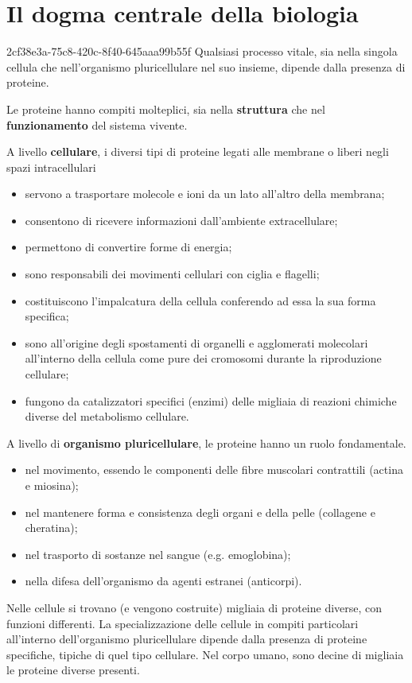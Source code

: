\documentclass[preview]{standalone}
\begin{document}
\genpage

\section{Il dogma centrale della biologia}

\begin{snippet}{2cf38e3a-75c8-420c-8f40-645aaa99b55f}
    Qualsiasi processo vitale, sia nella singola cellula che nell'organismo pluricellulare nel suo
    insieme, dipende dalla presenza di proteine.

    Le proteine hanno compiti molteplici, sia nella \textbf{struttura}
    che nel \textbf{funzionamento} del sistema
    vivente.

    A livello \textbf{cellulare}, i diversi tipi di proteine legati alle membrane o liberi negli spazi
    intracellulari

    \begin{itemize}
        \item servono a trasportare molecole e ioni da un lato all'altro della membrana;
        \item consentono di ricevere informazioni dall'ambiente extracellulare;
        \item permettono di convertire forme di energia;
        \item sono responsabili dei movimenti cellulari con ciglia e flagelli;
        \item costituiscono l'impalcatura della cellula conferendo ad essa la sua forma specifica;
        \item sono all'origine degli spostamenti di organelli e agglomerati molecolari all'interno della
        cellula come pure dei cromosomi durante la riproduzione cellulare;
        \item fungono da catalizzatori specifici (enzimi) delle migliaia di reazioni chimiche diverse del
        metabolismo cellulare.
    \end{itemize}

    A livello di \textbf{organismo pluricellulare}, le proteine hanno un ruolo
    fondamentale.

    \begin{itemize}
        \item nel movimento, essendo le componenti delle fibre muscolari contrattili
        (actina e miosina);
        \item nel mantenere forma e consistenza degli organi e della pelle (collagene e
        cheratina);
        \item nel trasporto di sostanze nel sangue (e.g. emoglobina);
        \item nella difesa dell'organismo da agenti estranei (anticorpi).
    \end{itemize}
    
    Nelle cellule si trovano (e vengono costruite) migliaia di proteine diverse, con
    funzioni differenti. La specializzazione delle cellule in compiti particolari
    all'interno dell'organismo pluricellulare dipende dalla presenza di proteine
    specifiche, tipiche di quel tipo cellulare. Nel corpo umano, sono decine di
    migliaia le proteine diverse presenti.
\end{snippet}
\end{document}
